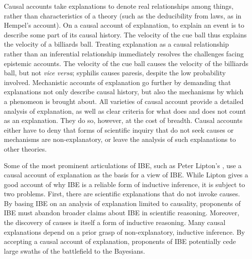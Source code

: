 \documentclass{article}[11pt]
\begin{document}
Causal accounts take explanations to denote real relationships among things, rather than characteristics of a theory (such as the deducibility from laws, as in Hempel's account). On a causal account of explanation, to explain an event is to describe some part of its causal history.  The velocity of the cue ball thus explains the velocity of a billiards ball.  Treating explanation as a causal relationship rather than an inferential relationship immediately resolves the challenges facing epistemic accounts.  The velocity of the cue ball causes the velocity of the billiards ball, but not \textit{vice versa}; syphilis causes paresis, despite the low probability involved. Mechanistic accounts of explanation go further by demanding that explanations not only describe causal history, but also the mechanisms by which a phenomeon is brought about.  All varieties of causal account provide a detailed analysis of explanation, as well as clear criteria for what does and does not count as an explanation.  They do so, however, at the cost of breadth.  Causal accounts either have to deny that forms of scientific inquiry that do not seek causes or mechanisms are non-explanatory, or leave the analysis of such explanations to other theories.


Some of the most prominent articulations of IBE, such as Peter Lipton's \parencite*{Lipton2004}, use a causal account of explanation as the basis for a view of IBE.  While Lipton gives a good account of why IBE is a reliable form of inductive inference, it is subject to two problems.  First, there are scientific explanations that do not invoke causes.  By basing IBE on an analysis of explanation limited to causality, proponents of IBE must abandon broader claims about IBE in scientific reasoning.  Moreover, the discovery of causes is itself a form of inductive reasoning. Many causal explanations depend on a prior grasp of non-explanatory, inductive inference.  By accepting a causal account of explanation, proponents of IBE potentially cede large swaths of the battlefield to the Bayesians.    
\end{document}
